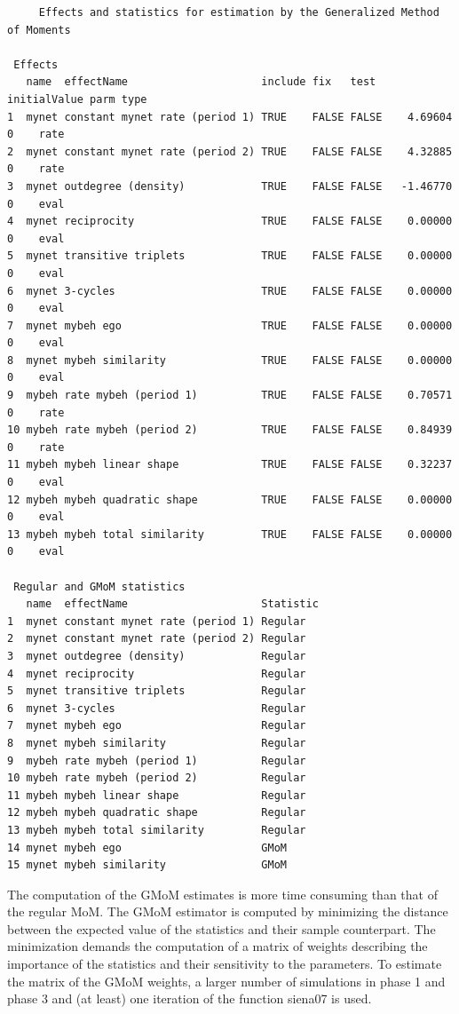\documentclass[a4paper,fleqn,11pt]{article}
\newcommand{\+}{\, + \,}
\begin{document}
{\footnotesize
\begin{verbatim}
	 Effects and statistics for estimation by the Generalized Method of Moments

 Effects
   name  effectName                     include fix   test  initialValue parm type
1  mynet constant mynet rate (period 1) TRUE    FALSE FALSE    4.69604   0    rate
2  mynet constant mynet rate (period 2) TRUE    FALSE FALSE    4.32885   0    rate
3  mynet outdegree (density)            TRUE    FALSE FALSE   -1.46770   0    eval
4  mynet reciprocity                    TRUE    FALSE FALSE    0.00000   0    eval
5  mynet transitive triplets            TRUE    FALSE FALSE    0.00000   0    eval
6  mynet 3-cycles                       TRUE    FALSE FALSE    0.00000   0    eval
7  mynet mybeh ego                      TRUE    FALSE FALSE    0.00000   0    eval
8  mynet mybeh similarity               TRUE    FALSE FALSE    0.00000   0    eval
9  mybeh rate mybeh (period 1)          TRUE    FALSE FALSE    0.70571   0    rate
10 mybeh rate mybeh (period 2)          TRUE    FALSE FALSE    0.84939   0    rate
11 mybeh mybeh linear shape             TRUE    FALSE FALSE    0.32237   0    eval
12 mybeh mybeh quadratic shape          TRUE    FALSE FALSE    0.00000   0    eval
13 mybeh mybeh total similarity         TRUE    FALSE FALSE    0.00000   0    eval

 Regular and GMoM statistics
   name  effectName                     Statistic
1  mynet constant mynet rate (period 1) Regular
2  mynet constant mynet rate (period 2) Regular
3  mynet outdegree (density)            Regular
4  mynet reciprocity                    Regular
5  mynet transitive triplets            Regular
6  mynet 3-cycles                       Regular
7  mynet mybeh ego                      Regular
8  mynet mybeh similarity               Regular
9  mybeh rate mybeh (period 1)          Regular
10 mybeh rate mybeh (period 2)          Regular
11 mybeh mybeh linear shape             Regular
12 mybeh mybeh quadratic shape          Regular
13 mybeh mybeh total similarity         Regular
14 mynet mybeh ego                      GMoM
15 mynet mybeh similarity               GMoM
\end{verbatim}}

\normalsize

The computation of the GMoM estimates is more time consuming than that of the regular MoM.
The GMoM estimator is computed by minimizing the distance between the
expected value of the statistics and their sample counterpart.
The minimization demands the computation of a matrix of weights
describing the importance of the statistics and their sensitivity
to the parameters. To estimate the matrix of the GMoM weights, a larger number of simulations
in phase 1 and phase 3 and (at least) one iteration of the function \textsf{siena07} is used.
\end{document}
